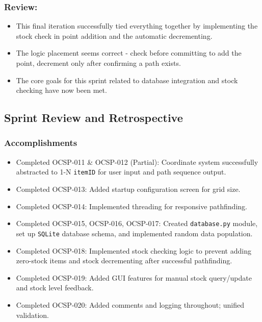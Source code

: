 \subsubsection{Review:}
\begin{itemize}
	\item This final iteration successfully tied everything together by implementing the stock check in point addition and the automatic decrementing.
	\item The logic placement seems correct - check before committing to add the point, decrement only after confirming a path exists.
	\item The core goals for this sprint related to database integration and stock checking have now been met.
\end{itemize}

\clearpage
\subsection{Sprint Review and Retrospective}

\subsubsection{Accomplishments}
\begin{itemize}
	\item Completed OCSP-011 \& OCSP-012 (Partial): Coordinate system successfully abstracted to 1-N \verb|itemID| for user input and path sequence output.
	\item Completed OCSP-013: Added startup configuration screen for grid size.
	\item Completed OCSP-014: Implemented threading for responsive pathfinding.
	\item Completed OCSP-015, OCSP-016, OCSP-017: Created \verb|database.py| module, set up \verb|SQLite| database schema, and implemented random data population.
	\item Completed OCSP-018: Implemented stock checking logic to prevent adding zero-stock items and stock decrementing after successful pathfinding.
	\item Completed OCSP-019: Added GUI features for manual stock query/update and stock level feedback.
	\item Completed OCSP-020: Added comments and logging throughout; unified validation.
\end{itemize}

